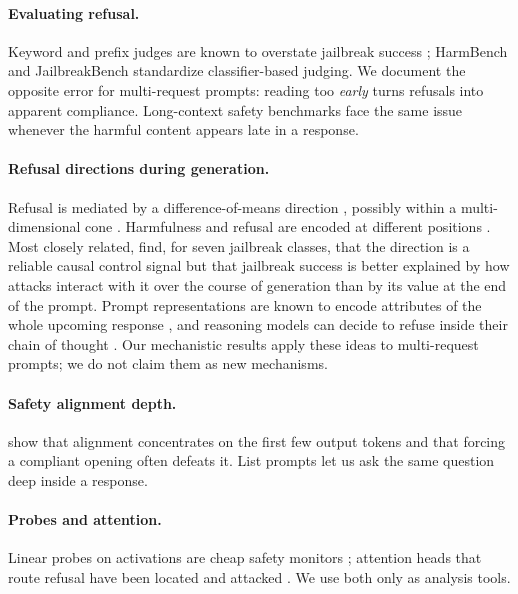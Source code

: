 \paragraph{Evaluating refusal.} Keyword and prefix judges are known to overstate jailbreak success
\citep{souly2024strongreject,zhu2024advprefix}; HarmBench \citep{mazeika2024harmbench} and JailbreakBench
\citep{chao2024jailbreakbench} standardize classifier-based judging. We document the opposite error for
multi-request prompts: reading too \emph{early} turns refusals into apparent compliance. Long-context safety
benchmarks \citep{lu2025longsafety,hadeliya2025refusals} face the same issue whenever the harmful content
appears late in a response.

\paragraph{Refusal directions during generation.} Refusal is mediated by a difference-of-means direction
\citep{arditi2024refusal}, possibly within a multi-dimensional cone \citep{wollschlaeger2025geometry}.
Harmfulness and refusal are encoded at different positions \citep{zhao2025separately}. Most closely related,
\citet{dahiya2026suppress} find, for seven jailbreak classes, that the direction is a reliable causal control
signal but that jailbreak success is better explained by how attacks interact with it over the course of
generation than by its value at the end of the prompt. Prompt representations are known to encode attributes
of the whole upcoming response \citep{dong2025planning}, and reasoning models can decide to refuse inside their
chain of thought \citep{yamaguchi2025reasoning}. Our mechanistic results apply these ideas to multi-request
prompts; we do not claim them as new mechanisms.

\paragraph{Safety alignment depth.} \citet{qi2025shallow} show that alignment concentrates on the first few
output tokens and that forcing a compliant opening often defeats it. List prompts let us ask the same question
deep inside a response.

\paragraph{Probes and attention.} Linear probes on activations are cheap safety monitors
\citep{cunningham2025cheap,mckenzie2025highstakes}; attention heads that route refusal have been located
\citep{he2024jailbreaklens} and attacked \citep{srivastava2026ara}. We use both only as analysis tools.

